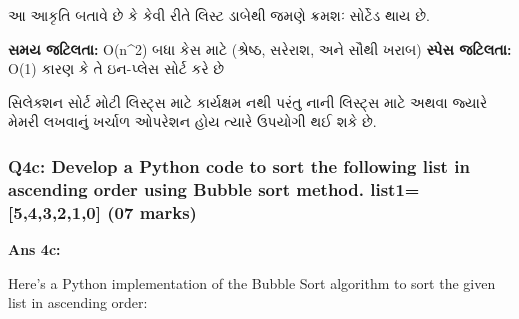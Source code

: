 આ આકૃતિ બતાવે છે કે કેવી રીતે લિસ્ટ ડાબેથી જમણે ક્રમશઃ સોર્ટેડ થાય છે.

\textbf{સમય જટિલતા:} O(n\^{}2) બધા કેસ માટે (શ્રેષ્ઠ, સરેરાશ, અને સૌથી ખરાબ)
\textbf{સ્પેસ જટિલતા:} O(1) કારણ કે તે ઇન-પ્લેસ સોર્ટ કરે છે

સિલેક્શન સોર્ટ મોટી લિસ્ટ્સ માટે કાર્યક્ષમ નથી પરંતુ નાની લિસ્ટ્સ માટે અથવા જ્યારે મેમરી
લખવાનું ખર્ચાળ ઓપરેશન હોય ત્યારે ઉપયોગી થઈ શકે છે.

\hypertarget{q4c-develop-a-python-code-to-sort-the-following-list-in-ascending-order-using-bubble-sort-method.-list1543210-07-marks}{%
\subsubsection{Q4c: Develop a Python code to sort the following list in
ascending order using Bubble sort method. list1={[}5,4,3,2,1,0{]} (07
marks)}\label{q4c-develop-a-python-code-to-sort-the-following-list-in-ascending-order-using-bubble-sort-method.-list1543210-07-marks}}

\textbf{Ans 4c:}

Here's a Python implementation of the Bubble Sort algorithm to sort the
given list in ascending order:

